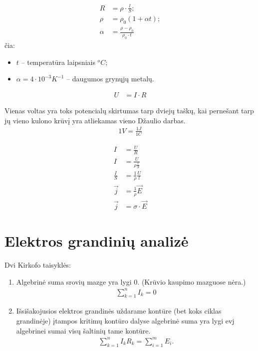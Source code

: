 \begin{defn}[Varža]
  \begin{align*}
    R &= \rho \cdot \frac{l}{S}; \\
    \rho &= \rho_{0} (1 + \alpha t); \\
    \alpha &= \frac{\rho - \rho_{0}}{\rho_{0} \cdot t}
  \end{align*}
  čia:
  \begin{itemize}
    \item $t$ – temperatūra laipsniais ${}^{o}C$;
    \item $\alpha = 4 \cdot 10^{-3} K^{-1}$ – daugumos grynųjų metalų.
  \end{itemize}
\end{defn}


\begin{align*}
  U &= I \cdot R
\end{align*}

\begin{defn}
  Vienas voltas yra toks potencialų skirtumas tarp dviejų taškų, kai
  pernešant tarp jų vieno kulono krūvį yra atliekamas vieno Džaulio
  darbas.
  \begin{align*}
    1 V = \frac{1J}{1C}
  \end{align*}
\end{defn}

\begin{align*}
  I &= \frac{U}{R} \\
  I &= \frac{U}{\rho \frac{l}{S}} \\
  \frac{I}{S} &= \frac{1}{\rho} \frac{U}{l} \\
  \vec{j} &= \frac{1}{\rho} \vec{E} \\
  \vec{j} &= \sigma \cdot \vec{E}
\end{align*}

\section{Elektros grandinių analizė}

Dvi Kirkofo taisyklės:
\begin{enumerate}
  \item Algebrinė suma srovių mazge yra lygi 0. (Krūvio kaupimo mazguose
    nėra.)
    \begin{align*}
      \sum ^{n} _{k=1} I_{k} = 0
    \end{align*}
  \item Išsišakojusios elektros grandinės uždarame kontūre (bet koks ciklas 
    grandinėje) įtampos kritimų kontūro dalyse algebrinė suma yra
    lygi evj algebrinei sumai visų šaltinių tame kontūre.
    \begin{align*}
      \sum _{k=1} ^{n} I_{k} R_{k} = \sum _{i=1} ^{m} E_{i}.
    \end{align*}
\end{enumerate}

